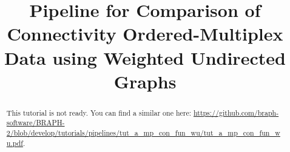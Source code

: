 \documentclass[justified]{tufte-handout}
\title[Comparison of Connectivity Ordered-Multiplex Data using WU]{Pipeline for Comparison of Connectivity Ordered-Multiplex Data using Weighted Undirected Graphs}
\begin{document}
\maketitle

\begin{abstract}
\noindent
This tutorial is not ready. You can find a similar one here: \url{https://github.com/braph-software/BRAPH-2/blob/develop/tutorials/pipelines/tut_a_mp_con_fun_wu/tut_a_mp_con_fun_wu.pdf}.
\end{abstract}
\end{document}
